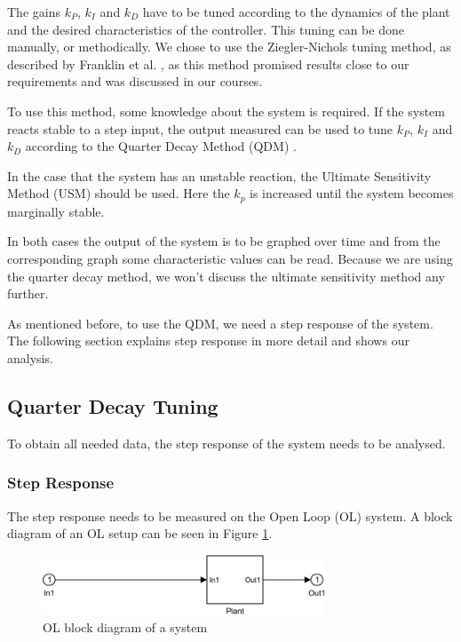 The gains $k_P$, $k_I$ and $k_D$ have to be tuned according to the dynamics of the plant
and the desired characteristics of the controller.
This tuning can be done manually, or methodically.
We chose to use the Ziegler-Nichols tuning method,
as described by Franklin et al. \cite{Franklin2014},
as this method promised results close to our requirements and was discussed in our courses.

To use this method, some knowledge about the system is required.
If the system reacts stable to a step input,
the output measured can be used to tune $k_P$, $k_I$ and $k_D$
according to the Quarter Decay Method (QDM) \cite{Franklin2014}.

In the case that the system has an unstable reaction,
the Ultimate Sensitivity Method (USM) should be used.
Here the $k_p$ is increased until the system becomes marginally stable.
\cite{Franklin2014}

In both cases the output of the system is to be graphed over time
and from the corresponding graph some characteristic values can be read.
Because we are using the quarter decay method,
we won't discuss the ultimate sensitivity method any further.

As mentioned before,
to use the QDM, we need a step response of the system.
The following section explains step response in more detail and shows our analysis.

\subsection{Quarter Decay Tuning}\label{sub:quadec}
To obtain all needed data, the step response of the system
needs to be analysed.

\subsubsection{Step Response}
The step response needs to be measured on the Open Loop (OL) system.
A block diagram of an OL setup can be seen in Figure \ref{fig:OL}.

\begin{figure}[H]
    \centering
    \includegraphics[width=0.75\textwidth]{figures/07controllerDesign/OLblock.pdf}
    \caption{OL block diagram of a system}
\label{fig:OL}
\end{figure}

